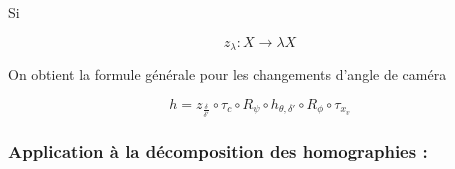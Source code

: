Si

\begin{equation*}
z_{\lambda}:X\rightarrow \lambda X
\end{equation*}

On obtient la formule générale pour les changements d'angle de caméra

\begin{equation}
h=z_{\frac{\delta}{\delta'}} \circ \tau_{c} \circ R_{\psi} \circ h_{\theta,\delta'} \circ R_{\phi} \circ \tau_{x_{v}}
\label{formul_decomp}
\end{equation}




\subsubsection{Application à la décomposition des homographies :}
